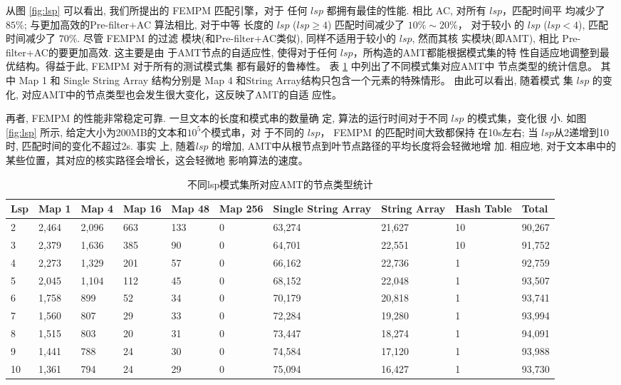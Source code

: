 \documentclass{ws-ijprai}
\begin{document}
从图 \ref{fig:lsp} 可以看出, 我们所提出的 \textsf{FEMPM} 匹配引擎，对于
任何 $lsp$ 都拥有最佳的性能. 相比 \textsf{AC}, 对所有 $lsp$，匹配时间平
均减少了 $85\%$; 与更加高效的\textsf{Pre-filter+AC} 算法相比, 对于中等
长度的 $lsp$ ($lsp \geq 4$) 匹配时间减少了 $10\% \sim 20\%$， 对于较小
的 $lsp$ ($lsp < 4$), 匹配时间减少了 $70\%$. 尽管 \textsf{FEMPM} 的过滤
模块(和\textsf{Pre-filter+AC}类似), 同样不适用于较小的 $lsp$, 然而其核
实模块(即AMT), 相比 \textsf{Pre-filter+AC}的要更加高效. 这主要是由
于AMT节点的自适应性, 使得对于任何 $lsp$，所构造的AMT都能根据模式集的特
性自适应地调整到最优结构。得益于此, \textsf{FEMPM} 对于所有的测试模式集
都有最好的鲁棒性。 表 \ref{tab:node types} 中列出了不同模式集对应AMT中
节点类型的统计信息。 其中 Map 1 和 Single String Array 结构分别是 Map
4 和String Array结构只包含一个元素的特殊情形。 由此可以看出, 随着模式
集 $lsp$ 的变化, 对应AMT中的节点类型也会发生很大变化，这反映了AMT的自适
应性。

再者, \textsf{FEMPM} 的性能非常稳定可靠. 一旦文本的长度和模式串的数量确
定, 算法的运行时间对于不同 $lsp$ 的模式集，变化很
小. 如图 \ref{fig:lsp} 所示, 给定大小为200MB的文本和$10^5$个模式串，对
于不同的 $lsp$， \textsf{FEMPM} 的匹配时间大致都保持
在10s左右; 当 $lsp$从2递增到10时, 匹配时间的变化不超过2s. 事实
上, 随着$lsp$ 的增加, AMT中从根节点到叶节点路径的平均长度将会轻微地增
加. 相应地, 对于文本串中的某些位置，其对应的核实路径会增长，这会轻微地
影响算法的速度。

\begin{table}[!htp]
  \centering
  \caption{不同lsp模式集所对应AMT的节点类型统计}
  \scriptsize
  \label{tab:node types}
  \begin{tabular}{p{10pt}p{15pt}p{15pt}p{15pt}p{15pt}p{15pt}p{25pt}p{25pt}p{20pt}p{25pt}}
 \hline
 Lsp &
 Map 1 &
 Map 4 &
 Map 16 &
 Map 48 &
 Map 256 &
 Single String Array &
 String Array   &
 Hash Table &
 Total\\
 \hline
 2  & 2,464 & 2,096 & 663 & 133 & 0 & 63,274 &  21,627 & 10 & 90,267\\
 3  & 2,379 & 1,636 & 385 & 90  & 0 & 64,701 &  22,551 & 10 & 91,752\\
 4  & 2,273 & 1,329 & 201 & 57  & 0 & 66,162 &  22,736 &  1 & 92,759\\
 5  & 2,045 & 1,104 & 112 & 45  & 0 & 68,152 &  22,048 &  1 & 93,507\\
 6  & 1,758 &   899 &  52 & 34  & 0 & 70,179 &  20,818 &  1 & 93,741\\
 7  & 1,560 &   807 &  29 & 33  & 0 & 72,284 &  19,280 &  1 & 93,994\\
 8  & 1,515 &   803 &  20 & 31  & 0 & 73,447 &  18,274 &  1 & 94,091\\
 9  & 1,441 &   788 &  24 & 30  & 0 & 74,584 &  17,120 &  1 & 93,988\\
10  & 1,361 &   794 &  24 & 29  & 0 & 75,094 &  16,427 &  1 & 93,730\\
\hline
  \end{tabular}
\end{table}
\end{document}
